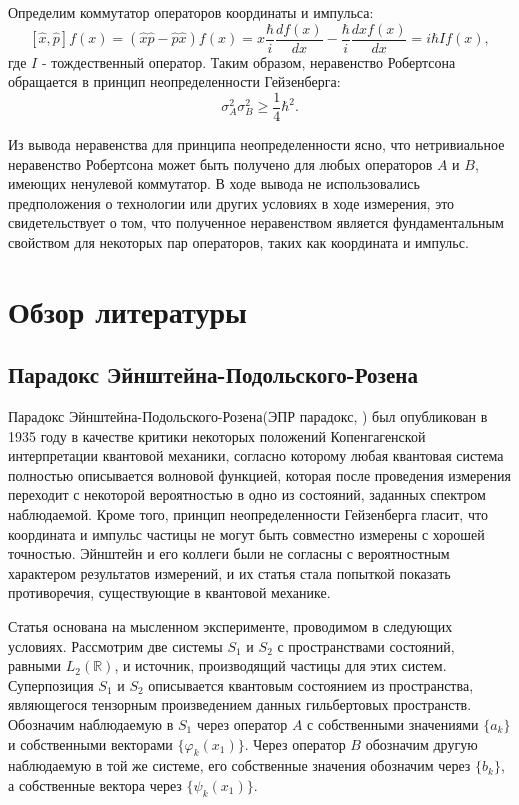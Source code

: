 \documentclass[%
master,         %
subf,           %
href,           %
,times         %
]{disser}
\numberwithin{equation}{section}
\numberwithin{figure}{section}
\begin{document}
Определим коммутатор операторов координаты и импульса:
\[
[\hat{x}, \hat{p}]f(x) = (\hat{x}\hat{p} - \hat{p}\hat{x})f(x) = x\frac{\hbar}{i}\frac{df(x)}{dx} - \frac{\hbar}{i}\frac{d xf(x)}{dx} = i\hbar If(x),
\]
где $I$ - тождественный оператор. Таким образом, неравенство Робертсона обращается в принцип неопределенности Гейзенберга:
\[
\sigma_A^2\sigma_B^2 \geq \frac{1}{4}\hbar^2.
\]

Из вывода неравенства для принципа неопределенности ясно, что нетривиальное неравенство Робертсона может быть получено для любых операторов $A$ и $B$, имеющих ненулевой коммутатор. В ходе вывода не использовались предположения о технологии или других условиях в ходе измерения, это свидетельствует о том, что полученное неравенством является фундаментальным свойством для некоторых пар операторов, таких как координата и импульс.

\chapter{Обзор литературы}

\section{Парадокс Эйнштейна-Подольского-Розена}
Парадокс Эйнштейна-Подольского-Розена(ЭПР парадокс, \cite{EPR}) был опубликован в 1935 году в качестве критики некоторых положений Копенгагенской интерпретации квантовой механики, согласно которому любая квантовая система полностью описывается волновой функцией, которая после проведения измерения переходит с некоторой вероятностью в одно из состояний, заданных спектром наблюдаемой. Кроме того, принцип неопределенности Гейзенберга гласит, что координата и импульс частицы не могут быть совместно измерены с хорошей точностью. Эйнштейн и его коллеги были не согласны с вероятностным характером результатов измерений, и их статья стала попыткой показать противоречия, существующие в квантовой механике.

Статья \cite{EPR} основана на мысленном эксперименте, проводимом в следующих условиях. Рассмотрим две системы $S_1$ и $S_2$ с пространствами состояний, равными $L_2(\mathbb{R})$, и источник, производящий частицы для этих систем.  Суперпозиция  $S_1$ и $S_2$ описывается квантовым состоянием из пространства, являющегося тензорным произведением данных гильбертовых пространств.  
Обозначим наблюдаемую в $S_1$ через оператор $A$ с собственными значениями $\{a_k\}$ и собственными векторами $\{\varphi_k(x_1)\}$. Через оператор $B$ обозначим другую наблюдаемую в той же системе, его собственные значения обозначим через $\{b_k\}$, а собственные вектора через $\{\psi_k(x_1)\}$. 
\end{document}
